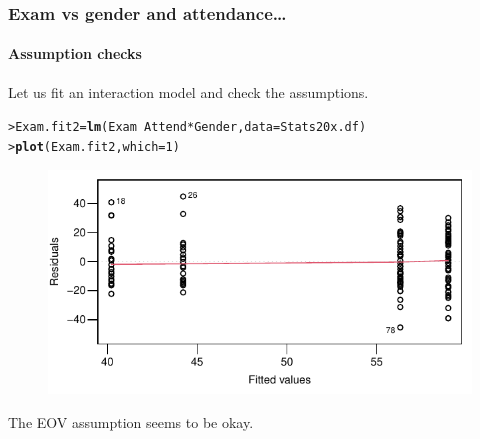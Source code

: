\documentclass{beamer}\usepackage[]{graphicx}\usepackage[]{xcolor}
\makeatletter
\newcommand{\hlnum}[1]{\textcolor[rgb]{0.686,0.059,0.569}{#1}}%
\newcommand{\hlopt}[1]{\textcolor[rgb]{0,0,0}{#1}}%
\newcommand{\hlstd}[1]{\textcolor[rgb]{0.345,0.345,0.345}{#1}}%
\newcommand{\hlkwb}[1]{\textcolor[rgb]{0.69,0.353,0.396}{#1}}%
\newcommand{\hlkwc}[1]{\textcolor[rgb]{0.333,0.667,0.333}{#1}}%
\newcommand{\hlkwd}[1]{\textcolor[rgb]{0.737,0.353,0.396}{\textbf{#1}}}%
\newenvironment{kframe}{%
 \def\at@end@of@kframe{}%
 \ifinner\ifhmode%
  \def\at@end@of@kframe{\end{minipage}}%
  \begin{minipage}{\columnwidth}%
 \fi\fi%
 \def\FrameCommand##1{\hskip\@totalleftmargin \hskip-\fboxsep
 \colorbox{shadecolor}{##1}\hskip-\fboxsep
     \hskip-\linewidth \hskip-\@totalleftmargin \hskip\columnwidth}%
 \MakeFramed {\advance\hsize-\width
   \@totalleftmargin\z@ \linewidth\hsize
   \@setminipage}}%
 {\par\unskip\endMakeFramed%
 \at@end@of@kframe}
\newenvironment{knitrout}{}{} %
\makeatother
\begin{document}
\begin{frame}[fragile]
\frametitle{Exam vs gender and attendance\ldots}
\framesubtitle{Assumption checks}

Let us fit an interaction model and check the assumptions.

\begin{knitrout}\scriptsize
{}\color{fgcolor}\begin{kframe}
\begin{alltt}
\hlstd{> }\hlstd{Exam.fit2} \hlkwb{=} \hlkwd{lm}\hlstd{(Exam} \hlopt{~} \hlstd{Attend}\hlopt{*}\hlstd{Gender,} \hlkwc{data} \hlstd{= Stats20x.df)}
\hlstd{> }\hlkwd{plot}\hlstd{(Exam.fit2,} \hlkwc{which}\hlstd{=}\hlnum{1}\hlstd{)}
\end{alltt}
\end{kframe}
\end{knitrout}



\begin{figure}
  \centering
  \includegraphics{figure/RC-H12-022}
\end{figure}

The EOV assumption seems to be okay.
\end{frame}
\end{document}
